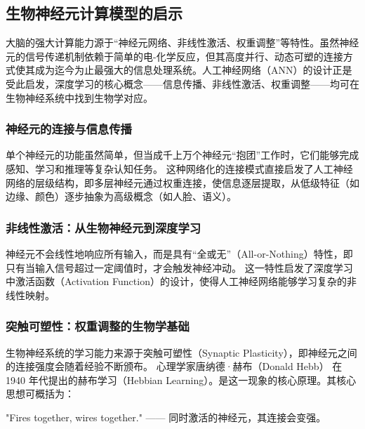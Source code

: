 \subsection{生物神经元计算模型的启示}
大脑的强大计算能力源于“神经元网络、非线性激活、权重调整”等特性。虽然神经元的信号传递机制依赖于简单的电-化学反应，但其高度并行、动态可塑的连接方式使其成为迄今为止最强大的信息处理系统。人工神经网络（ANN）的设计正是受此启发，深度学习的核心概念——信息传播、非线性激活、权重调整——均可在生物神经系统中找到生物学对应。

\subsubsection*{神经元的连接与信息传播}
单个神经元的功能虽然简单，但当成千上万个神经元“抱团”工作时，它们能够完成感知、学习和推理等复杂认知任务。 
这种网络化的连接模式直接启发了人工神经网络的层级结构，即多层神经元通过权重连接，使信息逐层提取，从低级特征（如边缘、颜色）逐步抽象为高级概念（如人脸、语义）。

\subsubsection*{非线性激活：从生物神经元到深度学习}

神经元不会线性地响应所有输入，而是具有“全或无”（All-or-Nothing）特性，即只有当输入信号超过一定阈值时，才会触发神经冲动。
这一特性启发了深度学习中激活函数（Activation Function）的设计，使得人工神经网络能够学习复杂的非线性映射。

\subsubsection*{突触可塑性：权重调整的生物学基础}

生物神经系统的学习能力来源于突触可塑性（Synaptic Plasticity），即神经元之间的连接强度会随着经验不断颁布。
心理学家唐纳德·赫布（Donald Hebb） 在 1940 年代提出的赫布学习（Hebbian Learning）。是这一现象的核心原理。其核心思想可概括为：

"Fires together, wires together." —— 同时激活的神经元，其连接会变强。

